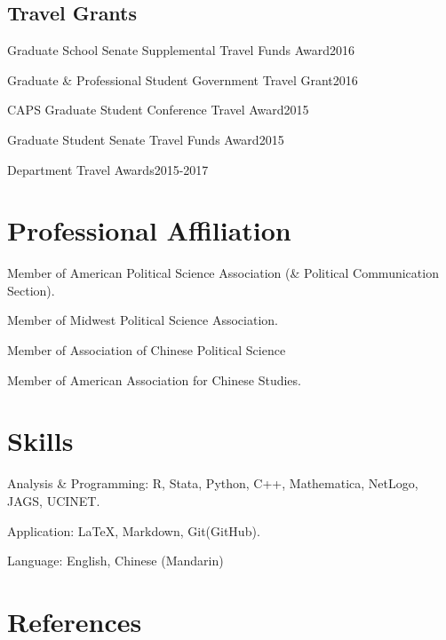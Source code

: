 \documentclass[10.5pt,]{article}
\providecommand{\tightlist}{%
	\setlength{\itemsep}{0pt}\setlength{\parskip}{0pt}}
\renewenvironment{itemize}{
	\begin{list}{}{
			\setlength{\leftmargin}{1.5em}
		}
	}{
	\end{list}
}
\begin{document}
\subsection{Travel Grants}\label{travel-grants}

\begin{itemize}
\tightlist
\item
  Graduate School Senate Supplemental Travel Funds Award\hfill 2016
\item
  Graduate \& Professional Student Government Travel Grant\hfill 2016
\item
  CAPS Graduate Student Conference Travel Award\hfill 2015
\item
  Graduate Student Senate Travel Funds Award\hfill 2015
\item
  Department Travel Awards\hfill 2015-2017
\end{itemize}

\section{Professional Affiliation}\label{professional-affiliation}

\begin{itemize}
\tightlist
\item
  Member of American Political Science Association (\& Political
  Communication Section).
\item
  Member of Midwest Political Science Association.
\item
  Member of Association of Chinese Political Science
\item
  Member of American Association for Chinese Studies.
\end{itemize}

\section{Skills}\label{skills}

\begin{itemize}
\tightlist
\item
  Analysis \& Programming: R, Stata, Python, C++, Mathematica, NetLogo,
  JAGS, UCINET.
\item
  Application: \LaTeX, Markdown, Git(GitHub).
\item
  Language: English, Chinese (Mandarin)
\end{itemize}

\section{References}\label{references}
\end{document}
